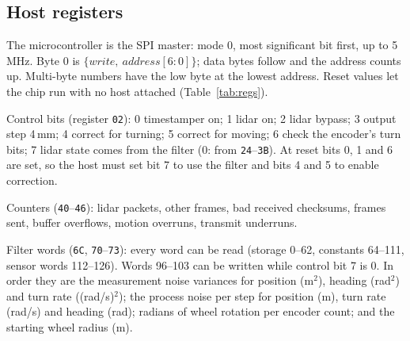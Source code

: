 \documentclass[10pt,letterpaper]{article}
\begin{document}
\subsection{Host registers}

The microcontroller is the SPI master: mode 0, most significant bit first, up to 5\,MHz.
Byte 0 is $\{\textit{write},\ \textit{address}[6{:}0]\}$; data bytes follow and the address counts up.
Multi-byte numbers have the low byte at the lowest address.
Reset values let the chip run with no host attached (Table~\ref{tab:regs}).

Control bits (register \texttt{02}): 0 timestamper on; 1 lidar on; 2 lidar bypass; 3 output step 4\,mm; 4 correct for turning; 5 correct for moving; 6 check the encoder's turn bits; 7 lidar state comes from the filter (0: from \texttt{24}--\texttt{3B}).
At reset bits 0, 1 and 6 are set, so the host must set bit 7 to use the filter and bits 4 and 5 to enable correction.

Counters (\texttt{40}--\texttt{46}): lidar packets, other frames, bad received checksums, frames sent, buffer overflows, motion overruns, transmit underruns.

Filter words (\texttt{6C}, \texttt{70}--\texttt{73}): every word can be read (storage 0--62, constants 64--111, sensor words 112--126).
Words 96--103 can be written while control bit 7 is 0.
In order they are the measurement noise variances for position (m$^2$), heading (rad$^2$) and turn rate ((rad/s)$^2$); the process noise per step for position (m), turn rate (rad/s) and heading (rad); radians of wheel rotation per encoder count; and the starting wheel radius (m).
\end{document}
